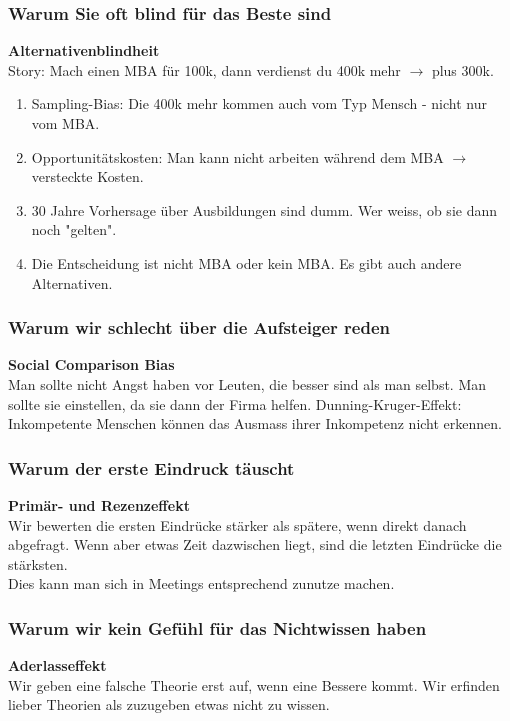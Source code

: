 \documentclass[a4paper, twocolumn]{article}
\begin{document}
\subsubsection*{Warum Sie oft blind für das Beste sind}
\textbf{Alternativenblindheit}\\
Story: Mach einen MBA für 100k, dann verdienst du 400k mehr $\rightarrow$ plus 300k.
\begin{enumerate}
	\item Sampling-Bias: Die 400k mehr kommen auch vom Typ Mensch - nicht nur vom MBA.
	\item Opportunitätskosten: Man kann nicht arbeiten während dem MBA $\rightarrow$ versteckte Kosten.
	\item 30 Jahre Vorhersage über Ausbildungen sind dumm. Wer weiss, ob sie dann noch "gelten".
	\item Die Entscheidung ist nicht MBA oder kein MBA. Es gibt auch andere Alternativen.
\end{enumerate}

\subsubsection*{Warum wir schlecht über die Aufsteiger reden}
\textbf{Social Comparison Bias}\\
Man sollte nicht Angst haben vor Leuten, die besser sind als man selbst. Man sollte sie einstellen, da sie dann der Firma helfen.
Dunning-Kruger-Effekt: Inkompetente Menschen können das Ausmass ihrer Inkompetenz nicht erkennen.

\subsubsection*{Warum der erste Eindruck täuscht}
\textbf{Primär- und Rezenzeffekt}\\
Wir bewerten die ersten Eindrücke stärker als spätere, wenn direkt danach abgefragt. Wenn aber etwas Zeit dazwischen liegt, sind die letzten Eindrücke die stärksten.\\
Dies kann man sich in Meetings entsprechend zunutze machen.

\subsubsection*{Warum wir kein Gefühl für das Nichtwissen haben}
\textbf{Aderlasseffekt}\\
Wir geben eine falsche Theorie erst auf, wenn eine Bessere kommt. Wir erfinden lieber Theorien als zuzugeben etwas nicht zu wissen.
\end{document}
